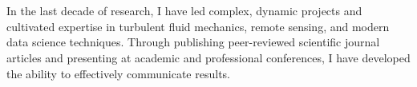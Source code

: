 


\\
 \\

\divider


  








In the last decade of research, I have led complex, dynamic projects and cultivated expertise in turbulent fluid mechanics, remote sensing, and  modern data science techniques. Through publishing peer-reviewed scientific journal articles and presenting at academic and professional conferences, I have developed the ability to effectively communicate results.

